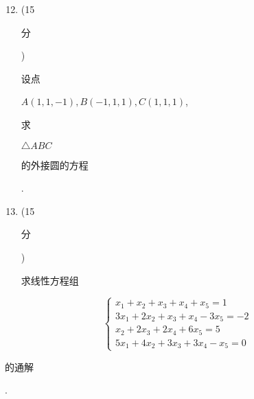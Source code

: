 \documentclass[10pt]{article}
\begin{document}
\begin{enumerate}
  \setcounter{enumi}{11}
  \item (15 \begin{CJK}{UTF8}{mj}分\end{CJK}) \begin{CJK}{UTF8}{mj}设点\end{CJK} $A(1,1,-1), B(-1,1,1), C(1,1,1)$, \begin{CJK}{UTF8}{mj}求\end{CJK} $\triangle A B C$ \begin{CJK}{UTF8}{mj}的外接圆的方程\end{CJK}.

  \item (15 \begin{CJK}{UTF8}{mj}分\end{CJK}) \begin{CJK}{UTF8}{mj}求线性方程组\end{CJK}

\end{enumerate}
$$
\left\{\begin{array}{l}
x_{1}+x_{2}+x_{3}+x_{4}+x_{5}=1 \\
3 x_{1}+2 x_{2}+x_{3}+x_{4}-3 x_{5}=-2 \\
x_{2}+2 x_{3}+2 x_{4}+6 x_{5}=5 \\
5 x_{1}+4 x_{2}+3 x_{3}+3 x_{4}-x_{5}=0
\end{array}\right.
$$
\begin{CJK}{UTF8}{mj}的通解\end{CJK}.
\end{document}
